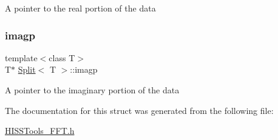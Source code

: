 A pointer to the real portion of the data \mbox{\label{struct_split_a21ff23a96abee0c0ed6a2433798c4eac}} 
\subsubsection{\texorpdfstring{imagp}{imagp}}
{\footnotesize\ttfamily template$<$class T$>$ \\
T$\ast$ \hyperlink{struct_split}{Split}$<$ T $>$\+::imagp}

A pointer to the imaginary portion of the data 

The documentation for this struct was generated from the following file\+:\begin{DoxyCompactItemize}
\item 
\hyperlink{_h_i_s_s_tools___f_f_t_8h}{H\+I\+S\+S\+Tools\+\_\+\+F\+F\+T.\+h}\end{DoxyCompactItemize}
